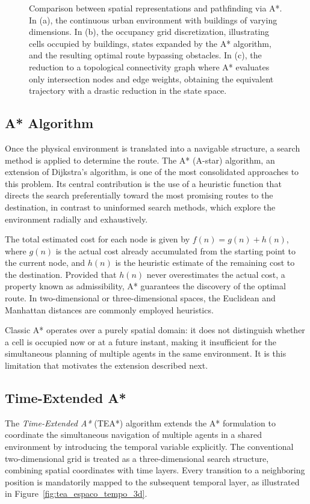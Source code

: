 \begin{figure}[!htbp]
    \caption{Comparison between spatial representations and pathfinding via A*. In (a), the continuous urban environment with buildings of varying dimensions. In (b), the occupancy grid discretization, illustrating cells occupied by buildings, states expanded by the A* algorithm, and the resulting optimal route bypassing obstacles. In (c), the reduction to a topological connectivity graph where A* evaluates only intersection nodes and edge weights, obtaining the equivalent trajectory with a drastic reduction in the state space.}
    \label{fig:representacoes_espaciais}
\end{figure}

\subsection{A* Algorithm}

Once the physical environment is translated into a navigable structure, a search method is applied to determine the route. The A* (A-star) algorithm, an extension of Dijkstra's algorithm, is one of the most consolidated approaches to this problem. Its central contribution is the use of a heuristic function that directs the search preferentially toward the most promising routes to the destination, in contrast to uninformed search methods, which explore the environment radially and exhaustively.

The total estimated cost for each node is given by $f(n) = g(n) + h(n)$, where $g(n)$ is the actual cost already accumulated from the starting point to the current node, and $h(n)$ is the heuristic estimate of the remaining cost to the destination. Provided that $h(n)$ never overestimates the actual cost, a property known as admissibility, A* guarantees the discovery of the optimal route. In two-dimensional or three-dimensional spaces, the Euclidean and Manhattan distances are commonly employed heuristics.

Classic A* operates over a purely spatial domain: it does not distinguish whether a cell is occupied now or at a future instant, making it insufficient for the simultaneous planning of multiple agents in the same environment. It is this limitation that motivates the extension described next.

\subsection{Time-Extended A*}\label{sec:tea}

The \textit{Time-Extended A*} (TEA*) algorithm extends the A* formulation to coordinate the simultaneous navigation of multiple agents in a shared environment by introducing the temporal variable explicitly. The conventional two-dimensional grid is treated as a three-dimensional search structure, combining spatial coordinates with time layers. Every transition to a neighboring position is mandatorily mapped to the subsequent temporal layer, as illustrated in Figure~\ref{fig:tea_espaco_tempo_3d}.
 
